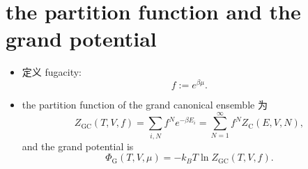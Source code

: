 \section{the partition function and the grand potential}
\begin{itemize}
	\item 定义 fugacity:
	\begin{equation}
		f := e^{\beta \mu}.
	\end{equation}
	
	\item the partition function of the grand canonical ensemble 为
	\begin{equation}
		Z_\text{GC}(T, V, f) = \sum_{i, N} f^N e^{- \beta E_i} = \sum_{N = 1}^\infty f^N Z_\text{C}(E, V, N),
	\end{equation}
	and the grand potential is
	\begin{equation}
		\Phi_\text{G}(T, V, \mu) = - k_B T \ln Z_\text{GC}(T, V, f).
	\end{equation}
\end{itemize}

